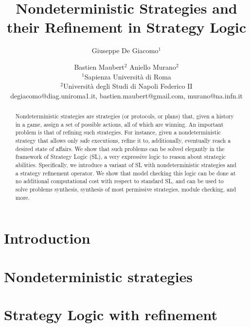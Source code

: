 \documentclass{article}
\title{Nondeterministic Strategies and their Refinement in Strategy Logic}
\author{
 Giuseppe De Giacomo$^1$\and
 Bastien Maubert$^2$\And
  Aniello Murano$^2$\\
 	\affiliations
 	$^1$Sapienza Università di Roma\\
 	$^2$Universit\`a degli Studi di Napoli Federico II\\
 	\emails
 	degiacomo@diag.uniroma1.it,
 	bastien.maubert@gmail.com,
 	murano@na.infn.it
}
\theoremstyle{definition}
\theoremstyle{plain}
\begin{document}
\maketitle

\begin{abstract}
  Nondeterministic strategies are strategies (or protocols, or plans)
  that, given a history in a game, assign a set of possible actions,
  all of which are winning.  An important problem is that of refining
  such strategies. For instance, given a nondeterministic strategy
  that allows only safe executions, refine it to, additionally,
  eventually reach a desired state of affairs. We show that such
  problems can be solved elegantly in the framework of Strategy Logic
  (SL), a very expressive logic to reason about strategic
  abilities. Specifically, we introduce a variant of SL with
  nondeterministic strategies and a strategy refinement operator. We
  show that model checking this logic can be done at no additional
  computational cost with respect to standard SL, and can be used to
  solve problems synthesis, synthesis of most permissive strategies,
  module checking, and more.
\end{abstract}

\section{Introduction}
\label{section:introduction}


\section{Nondeterministic strategies}
\label{section:refinement}





\section{Strategy Logic with refinement}
\label{section:SL}



% 
\end{document}
